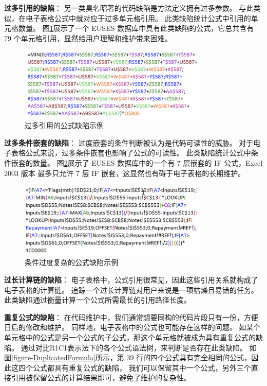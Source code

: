\textbf{过多引用的缺陷}：
另一类臭名昭著的代码缺陷是方法定义拥有过多参数。
与此类似，在电子表格公式中就对应于过多单元格引用。
此类缺陷统计公式中引用的单元格数量。
图\ref{figure-multipleReference}展示了一个 EUSES 数据库中具有此类缺陷的公式，它总共含有 79 个单元格引用，显然给用户理解和维护带来困难。

\begin{figure}[tp]    
    \centering
    \includegraphics[width=0.8\textwidth]{figure/relatedwork/multipleReference.png}
    \caption{过多引用的公式缺陷示例}
    \label{figure-multipleReference}
\end{figure}

\textbf{过多条件嵌套的缺陷}：
过度嵌套的条件判断被认为是代码可读性的威胁\cite{fowler1997refactoring}。
对于电子表格公式来说，过多条件嵌套也影响了公式的可读性。
此类缺陷统计公式中条件嵌套的数量。
图\ref{figure-ConditionalComplexity}展示了 EUSES 数据库中的一个有 7 层嵌套的 IF 公式，Excel 2003 版本 最多只允许 7 层 IF 嵌套，这显然也有碍于电子表格的长期维护。

\begin{figure}[tp]    
    \centering
    \includegraphics[width=0.8\textwidth]{figure/relatedwork/ConditionalComplexity.png}
    \caption{条件过度复杂的公式缺陷示例}
    \label{figure-ConditionalComplexity}
\end{figure}

\textbf{过长计算链的缺陷}：
电子表格中，公式引用很常见，因此这些引用关系就构成了电子表格的计算链。
追踪一个过长计算链对用户来说是一项枯燥且易错的任务。
此类缺陷通过衡量计算一个公式所需最长的引用路径长度。

\textbf{重复公式的缺陷}：
在代码维护中，我们通常想要同构的代码片段只有一份，方便日后的修改和维护。
同样地，电子表格中的公式也可能存在这样的问题。
如某个单元格中的公式是另一个公式的子公式，那这个单元格就被成为具有重复公式的缺陷。
通过对比R1C1表示法下的各个公式语法树，来判断是否存在此类缺陷。
如图\ref{figure-DuplicatedFormula}所示，第 39 行的四个公式具有完全相同的公式，因此这四个公式都具有重复公式的缺陷，
我们可以保留其中一个公式，另外三个直接引用被保留公式的计算结果即可，避免了维护的复杂性。

